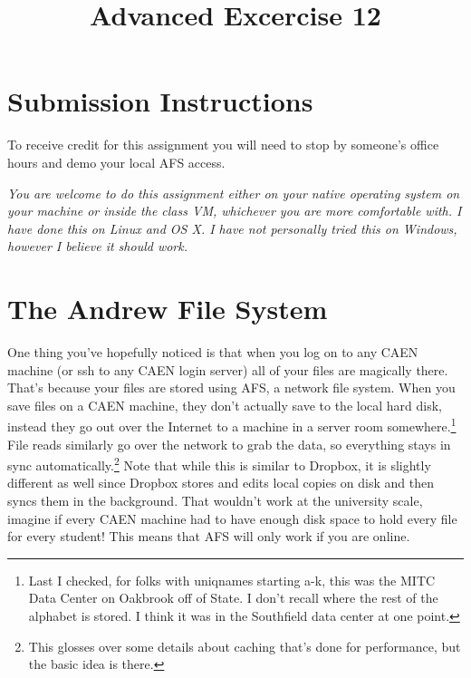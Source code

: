 \documentclass{article}
\begin{document}
\fancyfoot[C]{\color{gray} \thepage~/~\pageref*{LastPage}}
\pagestyle{fancyplain}


\title{\textbf{Advanced Excercise 12\\}}
\author{\textbf{\color{red}{Due: Saturday, April 8, 10:00PM (Hard Deadline)}}}
\date{}
\maketitle


\section*{Submission Instructions}
To receive credit for this assignment you will need to stop by someone's
office hours and demo your local AFS access.

\emph{You are welcome to do this assignment either on your native operating
  system on your machine or inside the class VM, whichever you are more
  comfortable with. I have done this on Linux and OS X. I have not personally
  tried this on Windows, however I believe it should work.}

\section*{The Andrew File System}

One thing you've hopefully noticed is that when you log on to any CAEN machine
(or ssh to any CAEN login server) all of your files are magically there.
That's because your files are stored using AFS, a network file system. When
you save files on a CAEN machine, they don't actually save to the local hard
disk, instead they go out over the Internet to a machine in a server room
somewhere.\footnote{Last I checked, for folks with uniqnames starting a-k,
this was the MITC Data Center on Oakbrook off of State. I don't recall where
the rest of the alphabet is stored. I think it was in the Southfield data
center at one point.} File reads similarly go over the network to grab the
data, so everything stays in sync automatically.\footnote{This glosses over
  some details about caching that's done for performance, but the basic idea
  is there.} Note that while this is similar to Dropbox, it is slightly
different as well since Dropbox stores and edits local copies on disk and then
syncs them in the background. That wouldn't work at the university scale,
imagine if every CAEN machine had to have enough disk space to hold every file
for every student! This means that AFS will only work if you are online.
\end{document}
